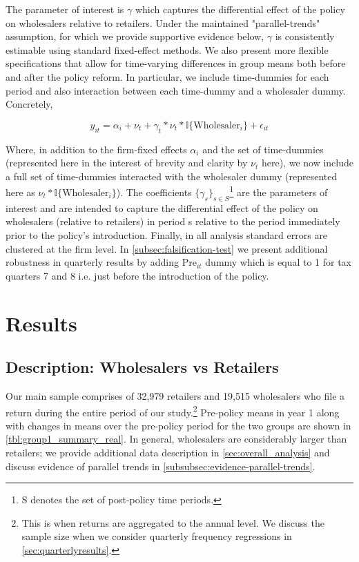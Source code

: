 The parameter of interest is $\gamma$ which captures the differential effect of the policy on wholesalers relative to retailers. Under the maintained "parallel-trends" assumption, for which we provide supportive evidence below, $\gamma$ is consistently estimable using standard fixed-effect methods. We also present more flexible specifications that allow for time-varying differences in group means both before and after the policy reform. In particular, we include time-dummies for each period and also interaction between each time-dummy and a wholesaler dummy. Concretely,

\begin{equation}\label{eq:flex}
y_{it}=\alpha_i+\nu_t+\gamma_t*\nu_t*\mathbb{I}\{\text{Wholesaler}_{i}\}+\epsilon_{it}
\end{equation}

Where, in addition to the firm-fixed effects $\alpha_i$ and the set of time-dummies (represented here in the interest of brevity and clarity by $\nu_t$ here), we now include a full set of time-dummies interacted with the wholesaler dummy (represented here as $\nu_t*\mathbb{I}\{\text{Wholesaler}_i\}$). The coefficients $\{\gamma_s\}_{s \in S }$\footnote{S denotes the set of post-policy time periods.} are the parameters of interest and are intended to capture the differential effect of the policy on wholesalers (relative to retailers) in period s relative to the period immediately prior to the policy's introduction. Finally, in all analysis standard errors are clustered at the firm level. In \cref{subsec:falsification-test} we present additional robustness in quarterly results by adding $\text{Pre}_{it}$ dummy which is equal to 1 for tax quarters 7 and 8 i.e. just before the introduction of the policy.

\section{Results}
\label{sec:1-results}

\subsection{Description: Wholesalers vs Retailers}	
\label{subsec:descripton_treatment_control}
Our main sample comprises of 32,979 retailers and 19,515 wholesalers who file a return during the entire period of our study.\footnote{This is when returns are aggregated to the annual level. We discuss the sample size when we consider quarterly frequency regressions in \cref{sec:quarterlyresults}.} Pre-policy means in year 1 along with changes in means over the pre-policy period for the two groups are shown in \cref{tbl:group1_summary_real}. In general, wholesalers are considerably larger than retailers; we provide additional data description in \cref{sec:overall_analysis} and discuss evidence of parallel trends in \cref{subsubsec:evidence-parallel-trends}.

